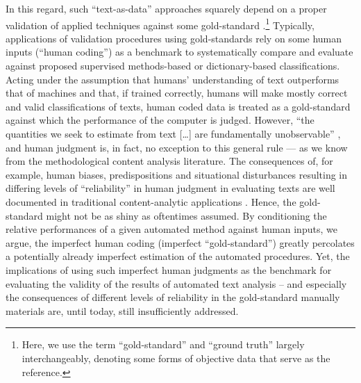 \documentclass[man, 12pt, a4paper, nolmodern, noextraspace]{apa6}
\begin{document}
    In this regard, such \enquote{text-as-data} approaches squarely depend on a proper validation of applied techniques against some gold-standard \parencite{grimmer2013text}.\footnote{Here, we use the term \enquote{gold-standard} and \enquote{ground truth} largely interchangeably, denoting some forms of objective data that serve as the reference.} Typically, applications of validation procedures using gold-standards rely on some human inputs (\enquote{human coding}) as a  benchmark to systematically compare and evaluate against proposed supervised methods-based or dictionary-based classifications. Acting under the assumption that humans’ understanding of text outperforms that of machines and that, if trained correctly, humans will make mostly correct and valid classifications of texts, human coded data is treated as a gold-standard against which the performance of the computer is judged. However, “the quantities we seek to estimate from text [\ldots] are fundamentally unobservable” \parencite[p. 299]{lowe2013validating}, and human judgment is, in fact, no exception to this general rule --- as we know from the methodological content analysis literature. The consequences of, for example, human biases, predispositions and situational disturbances resulting in differing levels of “reliability” in human judgment in evaluating texts are well documented in traditional content-analytic applications \parencite[e.g.,][]{krippendorff2004reliability, hayes2007answering, lombard2002content, ennser2018impact}. Hence, the gold-standard might not be as shiny as oftentimes assumed. By conditioning the relative performances of a given automated method against human inputs, we argue, the imperfect human coding (imperfect “gold-standard”) greatly percolates a potentially already imperfect estimation of the automated procedures. Yet, the implications of using such imperfect human judgments as the benchmark for evaluating the validity of the results of automated text analysis – and especially the consequences of different levels of reliability in the gold-standard manually materials are, until today, still insufficiently addressed.
    
\end{document}
